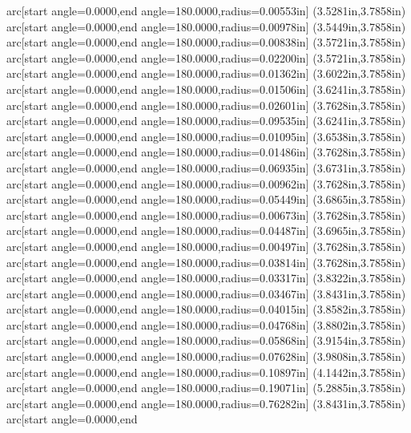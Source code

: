 arc[start angle=0.0000,end angle=180.0000,radius=0.00553in] (3.5281in,3.7858in) arc[start angle=0.0000,end angle=180.0000,radius=0.00978in] (3.5449in,3.7858in) arc[start angle=0.0000,end angle=180.0000,radius=0.00838in] (3.5721in,3.7858in) arc[start angle=0.0000,end angle=180.0000,radius=0.02200in] (3.5721in,3.7858in) arc[start angle=0.0000,end angle=180.0000,radius=0.01362in] (3.6022in,3.7858in) arc[start angle=0.0000,end angle=180.0000,radius=0.01506in] (3.6241in,3.7858in) arc[start angle=0.0000,end angle=180.0000,radius=0.02601in] (3.7628in,3.7858in) arc[start angle=0.0000,end angle=180.0000,radius=0.09535in] (3.6241in,3.7858in) arc[start angle=0.0000,end angle=180.0000,radius=0.01095in] (3.6538in,3.7858in) arc[start angle=0.0000,end angle=180.0000,radius=0.01486in] (3.7628in,3.7858in) arc[start angle=0.0000,end angle=180.0000,radius=0.06935in] (3.6731in,3.7858in) arc[start angle=0.0000,end angle=180.0000,radius=0.00962in] (3.7628in,3.7858in) arc[start angle=0.0000,end angle=180.0000,radius=0.05449in] (3.6865in,3.7858in) arc[start angle=0.0000,end angle=180.0000,radius=0.00673in] (3.7628in,3.7858in) arc[start angle=0.0000,end angle=180.0000,radius=0.04487in] (3.6965in,3.7858in) arc[start angle=0.0000,end angle=180.0000,radius=0.00497in] (3.7628in,3.7858in) arc[start angle=0.0000,end angle=180.0000,radius=0.03814in] (3.7628in,3.7858in) arc[start angle=0.0000,end angle=180.0000,radius=0.03317in] (3.8322in,3.7858in) arc[start angle=0.0000,end angle=180.0000,radius=0.03467in] (3.8431in,3.7858in) arc[start angle=0.0000,end angle=180.0000,radius=0.04015in] (3.8582in,3.7858in) arc[start angle=0.0000,end angle=180.0000,radius=0.04768in] (3.8802in,3.7858in) arc[start angle=0.0000,end angle=180.0000,radius=0.05868in] (3.9154in,3.7858in) arc[start angle=0.0000,end angle=180.0000,radius=0.07628in] (3.9808in,3.7858in) arc[start angle=0.0000,end angle=180.0000,radius=0.10897in] (4.1442in,3.7858in) arc[start angle=0.0000,end angle=180.0000,radius=0.19071in] (5.2885in,3.7858in) arc[start angle=0.0000,end angle=180.0000,radius=0.76282in] (3.8431in,3.7858in) arc[start angle=0.0000,end
